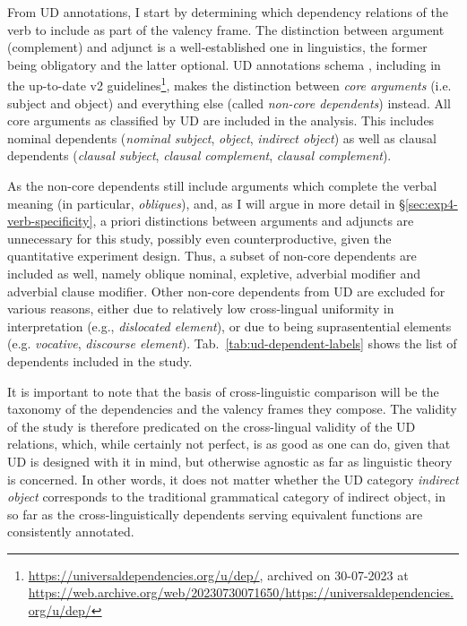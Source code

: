 From UD annotations, I start by determining which dependency relations of the verb to include as part of the valency frame. The distinction between argument (complement) and adjunct is a well-established one in linguistics, the former being obligatory and the latter optional. UD annotations schema \citep{demarneffe2014}, including in the up-to-date v2 guidelines\footnote{\url{https://universaldependencies.org/u/dep/}, archived on 30-07-2023 at \url{https://web.archive.org/web/20230730071650/https://universaldependencies.org/u/dep/}}, makes the distinction between \textit{core arguments} (i.e. subject and object) and everything else (called \textit{non-core dependents}) instead. All core arguments as classified by UD are included in the analysis. This includes nominal dependents (\textit{nominal subject}, \textit{object}, \textit{indirect object}) as well as clausal dependents (\textit{clausal subject}, \textit{clausal complement}, \textit{clausal complement}). 

As the non-core dependents still include arguments which complete the verbal meaning (in particular, \textit{obliques}), and, as I will argue in more detail in §\ref{sec:exp4-verb-specificity}, a priori distinctions between arguments and adjuncts are unnecessary for this study, possibly even counterproductive, given the quantitative experiment design. Thus, a subset of non-core dependents are included as well, namely oblique nominal, expletive, adverbial modifier and adverbial clause modifier. Other non-core dependents from UD are excluded for various reasons, either due to relatively low cross-lingual uniformity in interpretation (e.g., \textit{dislocated element}), or due to being suprasentential elements (e.g. \textit{vocative}, \textit{discourse element}). Tab.~\ref{tab:ud-dependent-labels} shows the list of dependents included in the study.

It is important to note that the basis of cross-linguistic comparison will be the taxonomy of the dependencies and the valency frames they compose. The validity of the study is therefore predicated on the cross-lingual validity of the UD relations, which, while certainly not perfect, is as good as one can do, given that UD is designed with it in mind, but otherwise agnostic as far as linguistic theory is concerned. In other words, it does not matter whether the UD category \textit{indirect object} corresponds to the traditional grammatical category of indirect object, in so far as the cross-linguistically dependents serving equivalent functions are consistently annotated.

